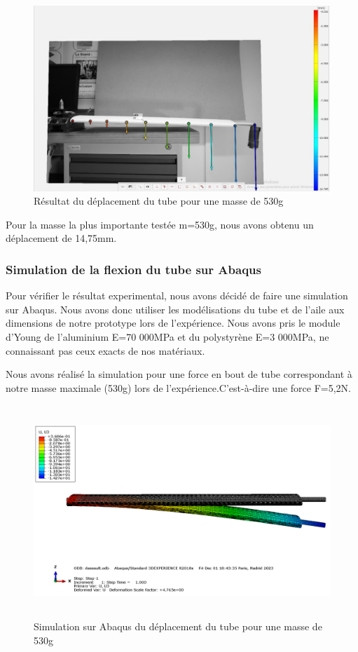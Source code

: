 \documentclass[a4paper,12pt,french]{report}
\begin{document}
\begin{figure}[h]
    \centering
    \includegraphics[height=7cm]{figures/530.jpg}
    \caption{Résultat du déplacement du tube pour une masse de 530g}
    \label{dep}
\end{figure}

Pour la masse la plus importante testée m=530g, nous avons obtenu un déplacement de 14,75mm.

\subsubsection{Simulation de la flexion du tube sur Abaqus}

Pour vérifier le résultat experimental, nous avons décidé de faire une simulation sur Abaqus. Nous avons donc utiliser les modélisations du tube et de l'aile aux dimensions de notre prototype lors de l'expérience. Nous avons pris le module d'Young de l'aluminium E=70 000MPa et du polystyrène E=3 000MPa, ne connaissant pas ceux exacts de nos matériaux.\newline

Nous avons réalisé la simulation pour une force en bout de tube correspondant à notre masse maximale (530g) lors de l'expérience.C'est-à-dire une force F=5,2N.\newline

\begin{figure}[h]
    \centering
    \includegraphics[height=8cm]{figures/simu.png}
    \caption{Simulation sur Abaqus du déplacement du tube pour une masse de 530g}
    \label{dep}
\end{figure}
\end{document}
